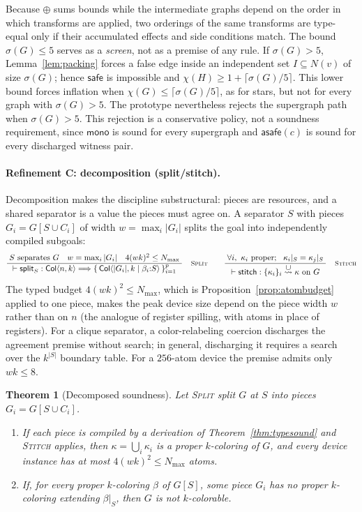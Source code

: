\documentclass[a4paper,fleqn]{cas-sc}
\newtheorem{theorem}{Theorem}[section]
\newcommand{\tCol}{\mathsf{Col}}
\newcommand{\Nmax}{N_{\max}}
\newcommand{\safe}{\textsf{safe}}
\newcommand{\asafe}[1]{\textsf{asafe}(#1)}
\newcommand{\monoeff}{\textsf{mono}}
\newcommand{\rn}[1]{\textup{\textsc{\footnotesize #1}}}
\newcommand{\irule}[2]{\ensuremath{\dfrac{\;#1\;}{\;#2\;}}}
\newcommand{\redto}[1]{\mathrel{\overset{\textstyle #1}{\rightsquigarrow}}}
\begin{document}
Because $\oplus$ sums bounds while the intermediate graphs depend on the order in
which transforms are applied, two orderings of the same transforms are type-equal only
if their accumulated effects and side conditions match. The bound $\sigma(G)\le5$
serves as a \emph{screen}, not as a premise of any rule. If $\sigma(G)>5$,
Lemma~\ref{lem:packing} forces a false edge inside an independent set
$I\subseteq N(v)$ of size $\sigma(G)$; hence $\safe$ is impossible and
$\chi(H)\ge1+\lceil\sigma(G)/5\rceil$. This lower bound forces inflation when
$\chi(G)\le\lceil\sigma(G)/5\rceil$, as for stars, but not for every graph with
$\sigma(G)>5$. The prototype nevertheless rejects the supergraph path when
$\sigma(G)>5$. This rejection is a conservative policy, not a soundness requirement,
since $\monoeff$ is sound for every supergraph and $\asafe{c}$ is sound for every
discharged witness pair.

\paragraph{Refinement C: decomposition (split/stitch).} Decomposition makes the
discipline substructural: pieces are resources, and a shared separator is a value the
pieces must agree on. A separator $S$ with pieces $G_i=G[S\cup C_i]$ of width
$w=\max_i|G_i|$ splits the goal into independently compiled subgoals:
\[
  \irule{S\ \text{separates}\ G \quad w=\max_i|G_i| \quad 4(wk)^2\le \Nmax}
        {\vdash \mathsf{split}_S : \tCol\langle n,k\rangle \Longrightarrow
           \{\,\tCol\langle |G_i|,k\mid\beta_i{:}S\rangle\,\}_{i=1}^{p}}
  \quad\rn{Split}
\qquad
  \irule{\forall i,\ \kappa_i\ \text{proper};\ \ \kappa_i|_S=\kappa_j|_S}
        {\vdash \mathsf{stitch} : \{\kappa_i\}_i \redto{\cup} \kappa\ \text{on}\ G}
  \quad\rn{Stitch}
\]
The typed budget $4(wk)^2\le\Nmax$, which is Proposition~\ref{prop:atombudget} applied
to one piece, makes the peak device size depend on the piece width $w$ rather than on
$n$ (the analogue of register spilling, with atoms in place of registers). For a
clique separator, a color-relabeling coercion discharges the agreement premise without
search; in general, discharging it requires a search over the $k^{|S|}$ boundary
table. For a $256$-atom device the premise admits only $wk\le8$.
\begin{theorem}[Decomposed soundness]
\label{thm:decsound}
Let \rn{Split} split $G$ at $S$ into pieces $G_i=G[S\cup C_i]$.
\begin{enumerate}[label=(\roman*),leftmargin=2.2em]
  \item If each piece is compiled by a derivation of Theorem~\ref{thm:typesound}
        and \rn{Stitch} applies, then $\kappa=\bigcup_i\kappa_i$ is a proper
        $k$-coloring of $G$, and every device instance has at most
        $4(wk)^2\le\Nmax$ atoms.
  \item If, for every proper $k$-coloring $\beta$ of $G[S]$, some piece $G_i$ has
        no proper $k$-coloring extending $\beta|_S$, then $G$ is not
        $k$-colorable.
\end{enumerate}
\end{theorem}
\end{document}
